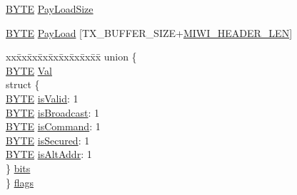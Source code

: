 \begin{DoxyCompactItemize}
\begin{tabbing}
\end{tabbing}\item 
\hyperlink{_generic_type_defs_8h_a4ae1dab0fb4b072a66584546209e7d58}{B\+Y\+T\+E} \hyperlink{struct_i_n_d_i_r_e_c_t___m_e_s_s_a_g_e_a0afc809f4b5f61d553c168150037df57}{Pay\+Load\+Size}
\item 
\hyperlink{_generic_type_defs_8h_a4ae1dab0fb4b072a66584546209e7d58}{B\+Y\+T\+E} \hyperlink{struct_i_n_d_i_r_e_c_t___m_e_s_s_a_g_e_a87328217db29b463f904a3934289dc36}{Pay\+Load} \mbox{[}T\+X\+\_\+\+B\+U\+F\+F\+E\+R\+\_\+\+S\+I\+Z\+E+\hyperlink{_mi_wi_8h_ab3d07208131a3506483a0d2b7d159bad}{M\+I\+W\+I\+\_\+\+H\+E\+A\+D\+E\+R\+\_\+\+L\+E\+N}\mbox{]}
\item 
\begin{tabbing}
xx\=xx\=xx\=xx\=xx\=xx\=xx\=xx\=xx\=\kill
union \{\\
\>\hyperlink{_generic_type_defs_8h_a4ae1dab0fb4b072a66584546209e7d58}{BYTE} \hyperlink{struct_i_n_d_i_r_e_c_t___m_e_s_s_a_g_e_a5ab8c2bf45b20b5f7aa3a4f083896cec}{Val}\\
\>struct \{\\
\>\>\hyperlink{_generic_type_defs_8h_a4ae1dab0fb4b072a66584546209e7d58}{BYTE} \hyperlink{struct_i_n_d_i_r_e_c_t___m_e_s_s_a_g_e_af1cac6e82b75a4d9e92ac637101c54e2}{isValid}: 1\\
\>\>\hyperlink{_generic_type_defs_8h_a4ae1dab0fb4b072a66584546209e7d58}{BYTE} \hyperlink{struct_i_n_d_i_r_e_c_t___m_e_s_s_a_g_e_a96538013b2f93acf8ef08671b38b63dd}{isBroadcast}: 1\\
\>\>\hyperlink{_generic_type_defs_8h_a4ae1dab0fb4b072a66584546209e7d58}{BYTE} \hyperlink{struct_i_n_d_i_r_e_c_t___m_e_s_s_a_g_e_aeaccc3aae04d11711ce7c8b1923788cf}{isCommand}: 1\\
\>\>\hyperlink{_generic_type_defs_8h_a4ae1dab0fb4b072a66584546209e7d58}{BYTE} \hyperlink{struct_i_n_d_i_r_e_c_t___m_e_s_s_a_g_e_aa2fc68f45fbebcd0e0aa5219878719e2}{isSecured}: 1\\
\>\>\hyperlink{_generic_type_defs_8h_a4ae1dab0fb4b072a66584546209e7d58}{BYTE} \hyperlink{struct_i_n_d_i_r_e_c_t___m_e_s_s_a_g_e_abec340a9c6fdb591175374a007838097}{isAltAddr}: 1\\
\>\} \hyperlink{struct_i_n_d_i_r_e_c_t___m_e_s_s_a_g_e_a8a0dd26a9a0818928f5a49b9e6e5f490}{bits}\\
\} \hyperlink{struct_i_n_d_i_r_e_c_t___m_e_s_s_a_g_e_a3be861af08709eda0fe021434330965b}{flags}\\

\end{tabbing}\end{DoxyCompactItemize}


